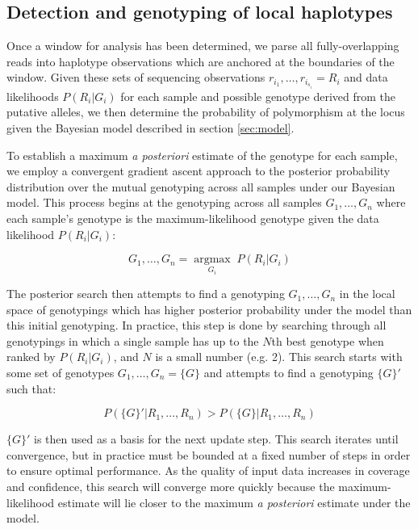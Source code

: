 \documentclass{article}
\begin{document}
\subsection{Detection and genotyping of local haplotypes}
\label{sec:genotyping}

Once a window for analysis has been determined, we parse all fully-overlapping reads into haplotype observations which are anchored at the boundaries of the window.  Given these sets of sequencing observations $r_{i_1},\ldots,r_{i_{s_i}} = R_i$ and data likelihoods $P(R_i|G_i)$ for each sample and possible genotype derived from the putative alleles, we then determine the probability of polymorphism at the locus given the Bayesian model described in section \ref{sec:model}.

To establish a maximum \emph{a posteriori} estimate of the genotype for each sample, we employ a convergent gradient ascent approach to the posterior probability distribution over the mutual genotyping across all samples under our Bayesian model.  This process begins at the genotyping across all samples $G_1,\ldots,G_n$ where each sample's genotype is the maximum-likelihood genotype given the data likelihood $P(R_i|G_i)$:

\begin{equation}
G_1,\ldots,G_n =
\underset{G_i}{\operatorname{argmax}} \; P(R_i|G_i)
\end{equation}

The posterior search then attempts to find a genotyping $G_1,\ldots,G_n$ in the local space of genotypings which has higher posterior probability under the model than this initial genotyping.  In practice, this step is done by searching through all genotypings in which a single sample has up to the $N$th best genotype when ranked by $P(R_i|G_i)$, and $N$ is a small number (e.g. 2).  This search starts with some set of genotypes $G_1,\ldots,G_n = \{G\}$ and attempts to find a genotyping $\{G\}'$ such that:

\begin{equation}
P(\{G\}'|R_1,\ldots,R_n) > P(\{G\}|R_1,\ldots,R_n)
\end{equation}

$\{G\}'$ is then used as a basis for the next update step.  This search iterates until convergence, but in practice must be bounded at a fixed number of steps in order to ensure optimal performance.  As the quality of input data increases in coverage and confidence, this search will converge more quickly because the maximum-likelihood estimate will lie closer to the maximum \emph{a posteriori} estimate under the model.
\end{document}

